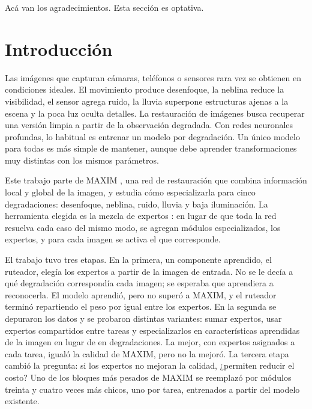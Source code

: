 \documentclass[
  11pt,
  oneside,
  english,
  spanish,
  singlespacing,
  headsepline
]{MastersDoctoralThesis}
\begin{document}
\begin{acknowledgements}
Acá van los agradecimientos. Esta sección es optativa.
\end{acknowledgements}

{
  \hypersetup{linkcolor=black}
  \setcounter{tocdepth}{1}
  \tableofcontents
  \listoffigures
  \renewcommand{\listtablename}{Índice de tablas}
  \listoftables
}


\mainmatter
\pagestyle{thesis}

\chapter{Introducción}
\label{chap:introduccion}

Las imágenes que capturan cámaras, teléfonos o sensores rara vez se obtienen en condiciones ideales. El movimiento produce desenfoque, la neblina reduce la visibilidad, el sensor agrega ruido, la lluvia superpone estructuras ajenas a la escena y la poca luz oculta detalles. La restauración de imágenes busca recuperar una versión limpia a partir de la observación degradada. Con redes neuronales profundas, lo habitual es entrenar un modelo por degradación. Un único modelo para todas es más simple de mantener, aunque debe aprender transformaciones muy distintas con los mismos parámetros.

Este trabajo parte de MAXIM \citep{tu2022maxim}, una red de restauración que combina información local y global de la imagen, y estudia cómo especializarla para cinco degradaciones: desenfoque, neblina, ruido, lluvia y baja iluminación. La herramienta elegida es la mezcla de expertos \citep{jacobs1991adaptive,shazeer2017outrageously}: en lugar de que toda la red resuelva cada caso del mismo modo, se agregan módulos especializados, los expertos, y para cada imagen se activa el que corresponde.

El trabajo tuvo tres etapas. En la primera, un componente aprendido, el ruteador, elegía los expertos a partir de la imagen de entrada. No se le decía a qué degradación correspondía cada imagen; se esperaba que aprendiera a reconocerla. El modelo aprendió, pero no superó a MAXIM, y el ruteador terminó repartiendo el peso por igual entre los expertos. En la segunda se depuraron los datos y se probaron distintas variantes: sumar expertos, usar expertos compartidos entre tareas y especializarlos en características aprendidas de la imagen en lugar de en degradaciones. La mejor, con expertos asignados a cada tarea, igualó la calidad de MAXIM, pero no la mejoró. La tercera etapa cambió la pregunta: si los expertos no mejoran la calidad, ¿permiten reducir el costo? Uno de los bloques más pesados de MAXIM se reemplazó por módulos treinta y cuatro veces más chicos, uno por tarea, entrenados a partir del modelo existente.
\end{document}
